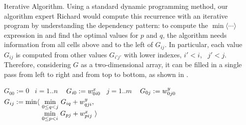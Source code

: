 \begin{paragraph}{Iterative Algorithm.}
Using a standard dynamic programming method, our algorithm expert Richard would compute this recurrence
with an iterative program by understanding the dependency pattern:
to compute the $\min\langle\cdots\rangle$ expression in  and find the optimal
values for $p$ and $q$, the algorithm needs information from all cells above and to the left of $G_{ij}$.
In particular, each value $G_{ij}$ is computed from other values $G_{i'j'}$ with lower
indexes, $i'<i$, ~$j'<j$. 
Therefore, considering $G$ as a two-dimensional array, it can be filled in a single pass from left to right and from top
to bottom, as shown in .
\end{paragraph}

\newcommand\FORLINE[1]{\State\algorithmicfor~{#1} \algorithmicdo~}
\newcommand\Head[1]{\Comment{ {\it #1} ~~}}

\begin{algorithm}
\renewcommand\arraystretch{1.3}
\begin{algorithmic}
  \State $G_{00} := 0$    \Head{Initialize}
  \FORLINE{$i=1..n$}  $G_{i0} := w^x_{0i0}$
  \FORLINE{$j=1..m$}  $G_{0j} := w^y_{0j0}$  
            \Head{Compute}
      \State $G_{ij} :=
        \begin{array}[t]{@{}l@{~}l} 
          \min\langle & \underset{0\leq q<j}\min ~ G_{iq} + \yw{qji}, \\
                      & \underset{0\leq p<i}\min ~ G_{pj} + \xw{pij}~\rangle \\         
        \end{array}$
    \EndFor
  \EndFor
\end{algorithmic}
\caption{\label{overview:iterative}
   Iterative Simplified Arbiter}
\end{algorithm}



\newcommand\qbox[1]{\fbox{\rm\scriptsize#1}}


